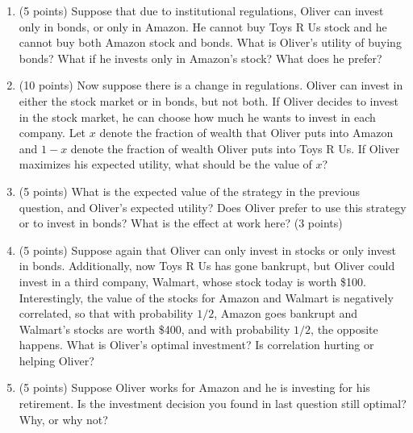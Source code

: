 \documentclass{article}
\begin{document}
\begin{enumerate}
\item (5 points) Suppose that due to institutional regulations, Oliver can invest only in bonds, or only in Amazon. He cannot buy Toys R Us stock and he cannot buy both Amazon stock and bonds. What is Oliver's utility of buying bonds? What if he invests only in Amazon's stock? What does he prefer?
\item (10 points) Now suppose there is a change in regulations. Oliver can invest in either the stock market or in bonds, but not both. If Oliver decides to invest in the stock market, he can choose how much he wants to invest in each company. Let $x$ denote the fraction of wealth that Oliver puts into Amazon and $1 - x$ denote the fraction of wealth Oliver puts into Toys R Us. If Oliver maximizes his expected utility, what should be the value of $x$?
\item (5 points) What is the expected value of the strategy in the previous question, and Oliver's expected utility? Does Oliver prefer to use this strategy or to invest in bonds? What is the effect at work here? (3 points)
\item (5 points) Suppose again that Oliver can only invest in stocks or only invest in bonds. Additionally, now Toys R Us has gone bankrupt, but Oliver could invest in a third company, Walmart, whose stock today is worth \$100. Interestingly, the value of the stocks for Amazon and Walmart is negatively correlated, so that with probability $1/2$, Amazon goes bankrupt and Walmart's stocks are worth \$400, and with probability $1/2$, the opposite happens. What is Oliver's optimal investment? Is correlation hurting or helping Oliver?
\item (5 points) Suppose Oliver works for Amazon and he is investing for his retirement. Is the investment decision you found in last question still optimal? Why, or why not?
\end{enumerate}

\end{document}
